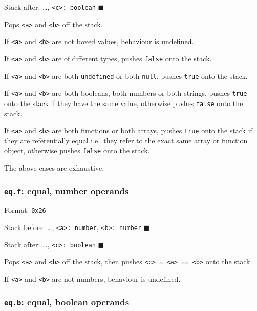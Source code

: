 Stack after: \ldots, \texttt{\textless{}c\textgreater{}:\ boolean}
\(\blacksquare\)

Pops \texttt{\textless{}a\textgreater{}} and
\texttt{\textless{}b\textgreater{}} off the stack.

If \texttt{\textless{}a\textgreater{}} and
\texttt{\textless{}b\textgreater{}} are not boxed values, behaviour is
undefined.

If \texttt{\textless{}a\textgreater{}} and
\texttt{\textless{}b\textgreater{}} are of different types, pushes
\texttt{false} onto the stack.

If \texttt{\textless{}a\textgreater{}} and
\texttt{\textless{}b\textgreater{}} are both \texttt{undefined} or both
\texttt{null}, pushes \texttt{true} onto the stack.

If \texttt{\textless{}a\textgreater{}} and
\texttt{\textless{}b\textgreater{}} are both booleans, both numbers or
both strings, pushes \texttt{true} onto the stack if they have the same
value, otherwise pushes \texttt{false} onto the stack.

If \texttt{\textless{}a\textgreater{}} and
\texttt{\textless{}b\textgreater{}} are both functions or both arrays,
pushes \texttt{true} onto the stack if they are referentially equal
i.e.~they refer to the exact same array or function object, otherwise
pushes \texttt{false} onto the stack.

The above cases are exhaustive.

\subsubsection{\texorpdfstring{\texttt{eq.f}: equal, number
operands}{eq.f: equal, number operands}}

Format: \texttt{0x26}

Stack before: \ldots, \texttt{\textless{}a\textgreater{}:\ number},
\texttt{\textless{}b\textgreater{}:\ number} \(\blacksquare\)

Stack after: \ldots, \texttt{\textless{}c\textgreater{}:\ boolean}
\(\blacksquare\)

Pops \texttt{\textless{}a\textgreater{}} and
\texttt{\textless{}b\textgreater{}} off the stack, then pushes
\texttt{\textless{}c\textgreater{}\ =\ \textless{}a\textgreater{}\ ==\ \textless{}b\textgreater{}}
onto the stack.

If \texttt{\textless{}a\textgreater{}} and
\texttt{\textless{}b\textgreater{}} are not numbers, behaviour is
undefined.

\subsubsection{\texorpdfstring{\texttt{eq.b}: equal, boolean
operands}{eq.b: equal, boolean operands}}

